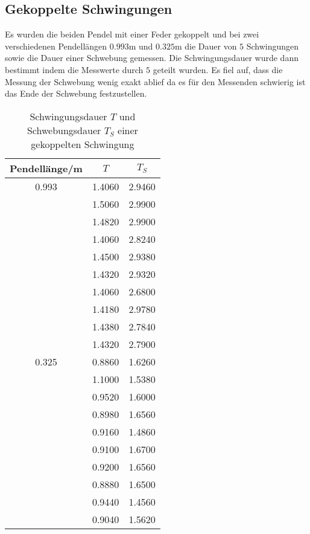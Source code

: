   \subsection{Gekoppelte Schwingungen}
    Es wurden die beiden Pendel mit einer Feder gekoppelt und bei zwei verschiedenen Pendellängen $0.993$m und $0.325$m die Dauer
    von $5$ Schwingungen sowie die Dauer einer Schwebung gemessen. Die Schwingungsdauer wurde dann bestimmt indem die Messwerte
    durch $5$ geteilt wurden. Es fiel auf, dass die Messung der Schwebung wenig exakt ablief da es für den Messenden schwierig
    ist das Ende der Schwebung festzustellen.
    \begin{table}
      \centering
        \caption{Schwingungsdauer $T$ und Schwebungsdauer $T_{S}$ einer gekoppelten Schwingung}
        \label{tab:aufgabe4}
        \begin{tabular}{S S S}
          \toprule
          {Pendellänge/m} & {$T$} & {$T_{S}$} \\
             &   1.4060 &     2.9460 \\
                  &   1.5060 &     2.9900 \\
                  &   1.4820 &     2.9900 \\
                  &   1.4060 &     2.8240 \\
                  &   1.4500 &     2.9380 \\
                  &   1.4320 &     2.9320 \\
                  &   1.4060 &     2.6800 \\
                  &   1.4180 &     2.9780 \\
                  &   1.4380 &     2.7840 \\
                  &   1.4320 &     2.7900 \\
          0.325   &   0.8860 &     1.6260 \\
                  &   1.1000 &     1.5380 \\
                  &   0.9520 &     1.6000 \\
                  &   0.8980 &     1.6560 \\
                  &   0.9160 &     1.4860 \\
                  &   0.9100 &     1.6700 \\
                  &   0.9200 &     1.6560 \\
                  &   0.8880 &     1.6500 \\
                  &   0.9440 &     1.4560 \\
                  &   0.9040 &     1.5620 \\
          \bottomrule
        \end{tabular}
      \end{table}
    \newpage
